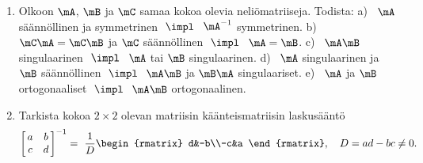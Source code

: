 \Harj
\begin{enumerate}

\item \label{H-m-2: pikku väittämiä}
Olkoon $\mA$, $\mB$ ja $\mC$ samaa kokoa olevia neliömatriiseja. Todista: \vspace{1mm}\newline
a) \ $\mA$ säännöllinen ja symmetrinen $\ \impl\ $ $\mA^{-1}$ symmetrinen. \newline
b) \ $\mC\mA=\mC\mB$ ja $\mC$ säännöllinen $\ \impl\ $ $\mA=\mB$. \newline
c) \ $\mA\mB$ singulaarinen $\ \impl\ $ $\mA$ tai $\mB$ singulaarinen. \newline
d) \ $\mA$ singulaarinen ja $\mB$ säännöllinen $\ \impl\ $ 
                                               $\mA\mB$ ja $\mB\mA$ singulaariset. \newline
e) \ $\mA$ ja $\mB$ ortogonaaliset $\ \impl\ $ $\mA\mB$ ortogonaalinen.

\item
Tarkista kokoa $2 \times 2$ olevan matriisin käänteismatriisin laskusääntö
\[
\begin{bmatrix} \,a&b\,\\\,c&d\, \end{bmatrix}^{-1}
=\ \frac{1}{D}\begin{rmatrix} d&-b\\-c&a \end{rmatrix}, \quad D=ad-bc \neq 0. 
\]


\end{enumerate}

